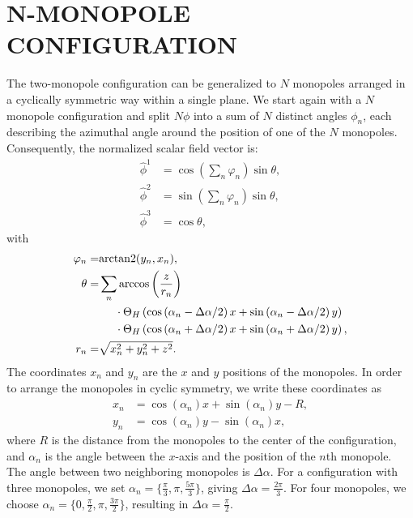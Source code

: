 \documentclass[aps, prd, twocolumn, superscriptaddress, preprintnumbers, nofootinbib, longbibliography]{revtex4-1}
\begin{document}
\section{\MakeUppercase{N-Monopole Configuration}}
\label{sec:n-monopole-configuration}
The two-monopole configuration can be generalized to $N$ monopoles arranged in a cyclically symmetric way within a single plane. We start again with a $N$ monopole configuration and split $N \phi$ into a sum of $N$ distinct angles $\phi_n$, each describing the azimuthal angle around the position of one of the $N$ monopoles.
Consequently, the normalized scalar field vector is:
\begin{align}
    \hat{\phi}^1&=\cos\left(\sum_n \varphi_n\right)\sin\theta,\nonumber\\
    \hat{\phi}^2&=\sin\left(\sum_n \varphi_n\right)\sin\theta,\nonumber\\
    \hat{\phi}^3&=\cos{\theta},
\end{align}
with
\begin{align}
    \varphi_n=&\text{arctan2}(y_n,x_n),\nonumber \\
    \theta=&\sum_n \arccos{\left(\frac{z}{r_n}\right)}\nonumber\\
    &\hspace{0.5cm}\cdot \Theta_H \left( \cos{\left(\alpha_n - \Delta \alpha/2\right)}\, x+\sin{\left(\alpha_n - \Delta \alpha /2\right)}\, y \right)\nonumber\\
    &\hspace{0.5cm}\cdot \Theta_H \left( \cos{\left(\alpha_n + \Delta \alpha/2\right)}\, x+\sin{\left(\alpha_n + \Delta \alpha /2\right)}\, y \right),\nonumber\\
    r_n=&\sqrt{x_n^2+y_n^2+z^2}.
\end{align}
The coordinates $x_n$ and $y_n$ are the $x$ and $y$ positions of the monopoles. In order to arrange the monopoles in cyclic symmetry, we write these coordinates as
\begin{align} 
\label{eq:coordinates-n-monopole}
    x_n &= \cos(\alpha_n)x + \sin(\alpha_n)y - R, \nonumber\\
    y_n &= \cos(\alpha_n)y - \sin(\alpha_n)x, 
\end{align}
where $R$ is the distance from the monopoles to the center of the configuration, and $\alpha_n$ is the angle between the $x$-axis and the position of the $n$th monopole. The angle between two neighboring monopoles is $\Delta \alpha$.
For a configuration with three monopoles, we set $\alpha_n = \lbrace \frac{\pi}{3}, \pi, \frac{5\pi}{3} \rbrace$, giving $\Delta \alpha = \frac{2\pi}{3}$. For four monopoles, we choose $\alpha_n = \lbrace 0, \frac{\pi}{2}, \pi, \frac{3\pi}{2} \rbrace$, resulting in $\Delta \alpha = \frac{\pi}{2}$.\\
\end{document}
